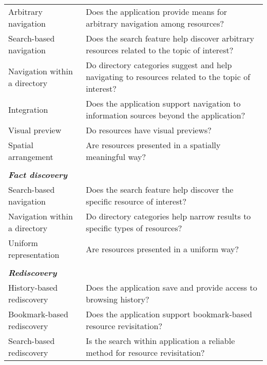 \documentclass{casconpaper}
\begin{document}
{\begin{table*}[htbp]
\begin{tabular}{|p{0.30\linewidth}|p{0.70\linewidth}|}
Arbitrary navigation         & Does the application provide means for arbitrary navigation among resources?                              \\
Search-based navigation      & Does the search feature help discover arbitrary resources related to the topic of interest?               \\
Navigation within a directory & Do directory categories suggest and help navigating to resources related to the topic of interest?           \\
Integration                  & Does the application support navigation to information sources beyond the application?                   \\
Visual preview               & Do resources have visual previews?                                                                        \\
Spatial arrangement          & Are resources presented in a spatially meaningful way?                                                    \\
&\\
\emph{\textbf{Fact discovery}}                &                                                                                                           \\
Search-based navigation      & Does the search feature help discover the specific resource of interest?                                  \\
Navigation within a directory & Do directory categories help narrow results to specific types of resources?                                   \\
Uniform representation       & Are resources presented in a uniform way?                                                                 \\
&\\
\emph{\textbf{Rediscovery}}                     &                                                                                                           \\
History-based rediscovery    & Does the application save and provide access to browsing history?                                        \\
Bookmark-based rediscovery   & Does the application support bookmark-based resource revisitation?                                        \\
Search-based rediscovery     & Is the search within application a reliable method for resource revisitation?                             \\

\end{tabular}
\end{table*}}
\end{document}
